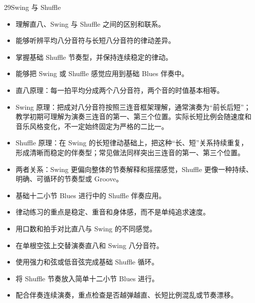 \begin{lessoncard}{29}{Swing 与 Shuffle}
\begin{itemize}
\item 理解直八、Swing 与 Shuffle 之间的区别和联系。
\item 能够听辨平均八分音符与长短八分音符的律动差异。
\item 掌握基础 Shuffle 节奏型，并保持连续稳定的律动。
\item 能够把 Swing 或 Shuffle 感觉应用到基础 Blues 伴奏中。
\end{itemize}
\begin{itemize}
\item 直八原理：每一拍平均分成两个八分音符，两个音的时值基本相等。
\item Swing 原理：把成对八分音符按照三连音框架理解，通常演奏为“前长后短”；教学初期可理解为演奏三连音的第一、第三个位置。实际长短比例会随速度和音乐风格变化，不一定始终固定为严格的二比一。
\item Shuffle 原理：在 Swing 的长短律动基础上，把这种“长、短”关系持续重复，形成清晰而稳定的伴奏型；常见做法同样突出三连音的第一、第三个位置。
\item 两者关系：Swing 更偏向整体的节奏解释和摇摆感觉，Shuffle 更像一种持续、明确、可循环的节奏型或 Groove。
\item 基础十二小节 Blues 进行中的 Shuffle 伴奏应用。
\item 律动练习的重点是稳定、重音和身体感，而不是单纯追求速度。
\end{itemize}
\begin{itemize}
\item 用口数和拍手对比直八与 Swing 的不同感觉。
\item 在单根空弦上交替演奏直八和 Swing 八分音符。
\item 使用强力和弦或低音弦完成基础 Shuffle 循环。
\item 将 Shuffle 节奏放入简单十二小节 Blues 进行。
\item 配合伴奏连续演奏，重点检查是否越弹越直、长短比例混乱或节奏漂移。
\end{itemize}
\begin{fignote}
\begin{center}
\end{center}
\end{fignote}
\end{lessoncard}
